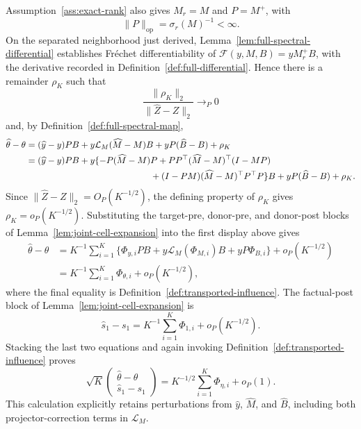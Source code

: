 Assumption~\ref{ass:exact-rank} also gives \(M_r=M\) and \(P=M^+\), with
\[
 \|P\|_{\mathrm{op}}=\sigma_r(M)^{-1}<\infty.
\]
On the separated neighborhood just derived, Lemma~\ref{lem:full-spectral-differential} establishes Fr\'echet differentiability of \(\mathcal F(y,M,B)=yM_r^+B\), with the derivative recorded in Definition~\ref{def:full-differential}. Hence there is a remainder \(\rho_K\) such that
\[
 \frac{\|\rho_K\|_2}{\|\widehat Z-Z\|_2}\to_P0
\]
and, by Definition~\ref{def:full-spectral-map},
\[
\begin{aligned}
 \widehat\theta-\theta
 &=(\widehat y-y)PB
   +y\mathcal L_M(\widehat M-M)B
   +yP(\widehat B-B)+\rho_K\\
 &=(\widehat y-y)PB
   +y\{-P(\widehat M-M)P
      +PP^\top(\widehat M-M)^\top(I-MP)\\
 &\hspace{4.9cm}
      +(I-PM)(\widehat M-M)^\top P^\top P\}B
   +yP(\widehat B-B)+\rho_K.
\end{aligned}
\]
Since \(\|\widehat Z-Z\|_2=O_P(K^{-1/2})\), the defining property of \(\rho_K\) gives \(\rho_K=o_P(K^{-1/2})\). Substituting the target-pre, donor-pre, and donor-post blocks of Lemma~\ref{lem:joint-cell-expansion} into the first display above gives
\[
\begin{aligned}
 \widehat\theta-\theta
 &=K^{-1}\sum_{i=1}^K
 \{\Phi_{y,i}PB+y\mathcal L_M(\Phi_{M,i})B+yP\Phi_{B,i}\}
 +o_P(K^{-1/2})\\
 &=K^{-1}\sum_{i=1}^K\Phi_{\theta,i}+o_P(K^{-1/2}),
\end{aligned}
\]
where the final equality is Definition~\ref{def:transported-influence}. The factual-post block of Lemma~\ref{lem:joint-cell-expansion} is
\[
 \widehat s_1-s_1
 =K^{-1}\sum_{i=1}^K\Phi_{1,i}+o_P(K^{-1/2}).
\]
Stacking the last two equations and again invoking Definition~\ref{def:transported-influence} proves
\[
 \sqrt K
 \begin{pmatrix}
  \widehat\theta-\theta\\
  \widehat s_1-s_1
 \end{pmatrix}
 =K^{-1/2}\sum_{i=1}^K\Phi_{\eta,i}+o_P(1).
\]
This calculation explicitly retains perturbations from \(\widehat y\), \(\widehat M\), and \(\widehat B\), including both projector-correction terms in \(\mathcal L_M\).

